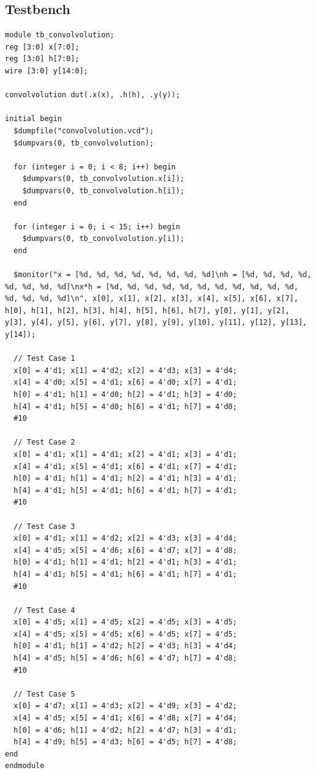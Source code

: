 \documentclass{article}
\begin{document}
\subsection*{Testbench}
\begin{lstlisting}[style=style]
module tb_convolvolution;
reg [3:0] x[7:0];
reg [3:0] h[7:0];
wire [3:0] y[14:0];

convolvolution dut(.x(x), .h(h), .y(y));

initial begin
  $dumpfile("convolvolution.vcd");
  $dumpvars(0, tb_convolvolution);

  for (integer i = 0; i < 8; i++) begin
    $dumpvars(0, tb_convolvolution.x[i]);
    $dumpvars(0, tb_convolvolution.h[i]);
  end

  for (integer i = 0; i < 15; i++) begin
    $dumpvars(0, tb_convolvolution.y[i]);
  end

  $monitor("x = [%d, %d, %d, %d, %d, %d, %d, %d]\nh = [%d, %d, %d, %d, %d, %d, %d, %d]\nx*h = [%d, %d, %d, %d, %d, %d, %d, %d, %d, %d, %d, %d, %d, %d, %d]\n", x[0], x[1], x[2], x[3], x[4], x[5], x[6], x[7], h[0], h[1], h[2], h[3], h[4], h[5], h[6], h[7], y[0], y[1], y[2], y[3], y[4], y[5], y[6], y[7], y[8], y[9], y[10], y[11], y[12], y[13], y[14]);

  // Test Case 1 
  x[0] = 4'd1; x[1] = 4'd2; x[2] = 4'd3; x[3] = 4'd4;
  x[4] = 4'd0; x[5] = 4'd1; x[6] = 4'd0; x[7] = 4'd1;
  h[0] = 4'd1; h[1] = 4'd0; h[2] = 4'd1; h[3] = 4'd0;
  h[4] = 4'd1; h[5] = 4'd0; h[6] = 4'd1; h[7] = 4'd0;
  #10

  // Test Case 2
  x[0] = 4'd1; x[1] = 4'd1; x[2] = 4'd1; x[3] = 4'd1;
  x[4] = 4'd1; x[5] = 4'd1; x[6] = 4'd1; x[7] = 4'd1;
  h[0] = 4'd1; h[1] = 4'd1; h[2] = 4'd1; h[3] = 4'd1;
  h[4] = 4'd1; h[5] = 4'd1; h[6] = 4'd1; h[7] = 4'd1;
  #10

  // Test Case 3
  x[0] = 4'd1; x[1] = 4'd2; x[2] = 4'd3; x[3] = 4'd4;
  x[4] = 4'd5; x[5] = 4'd6; x[6] = 4'd7; x[7] = 4'd8;
  h[0] = 4'd1; h[1] = 4'd1; h[2] = 4'd1; h[3] = 4'd1;
  h[4] = 4'd1; h[5] = 4'd1; h[6] = 4'd1; h[7] = 4'd1;
  #10

  // Test Case 4
  x[0] = 4'd5; x[1] = 4'd5; x[2] = 4'd5; x[3] = 4'd5;
  x[4] = 4'd5; x[5] = 4'd5; x[6] = 4'd5; x[7] = 4'd5;
  h[0] = 4'd1; h[1] = 4'd2; h[2] = 4'd3; h[3] = 4'd4;
  h[4] = 4'd5; h[5] = 4'd6; h[6] = 4'd7; h[7] = 4'd8;
  #10

  // Test Case 5
  x[0] = 4'd7; x[1] = 4'd3; x[2] = 4'd9; x[3] = 4'd2;
  x[4] = 4'd5; x[5] = 4'd1; x[6] = 4'd8; x[7] = 4'd4;
  h[0] = 4'd6; h[1] = 4'd2; h[2] = 4'd7; h[3] = 4'd1;
  h[4] = 4'd9; h[5] = 4'd3; h[6] = 4'd5; h[7] = 4'd8;
end
endmodule
\end{lstlisting}
\end{document}
